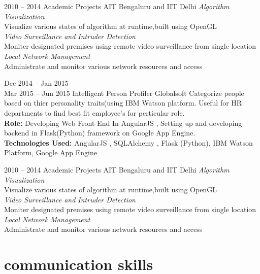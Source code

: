 \documentclass[print]{friggeri-cv} %
\begin{document}
\begin{entrylist}

\entry
{2010 -- 2014}
{Academic Projects}
{AIT Bengaluru and IIT Delhi}
{\emph{Algorithm Visualization}\\
Visualize various states of algorithm at runtime,built using OpenGL\\

\emph{Video Surveillance and Intruder Detection}\\
Moniter designated premises using remote video surveillance from single location\\

\emph{Local Network Management}\\
Administrate and monitor various network resources and access}


\entry
{ Dec 2014 -- Jan 2015\\
Mar 2015 -- Jun 2015}
{Intelligent Person Profiler}
{Globalsoft}
{Categorize people based on thier personality traits(using IBM Watson platform. Useful for HR departments to find best fit employee's for perticular role.\\
\textbf{Role:} Developing Web Front End In AngularJS , Setting up and developing backend in Flask(Python) framework on Google App Engine.\\
\textbf{Technologies Used:} AngularJS , SQLAlchemy , Flask (Python), IBM Watson Platform, Google App Engine}


\entry
{2010 -- 2014}
{Academic Projects}
{AIT Bengaluru and IIT Delhi}
{\emph{Algorithm Visualization}\\
Visualize various states of algorithm at runtime,built using OpenGL\\

\emph{Video Surveillance and Intruder Detection}\\
Moniter designated premises using remote video surveillance from single location\\

\emph{Local Network Management}\\
Administrate and monitor various network resources and access}
\end{entrylist}


\section{communication skills}
\end{document}
